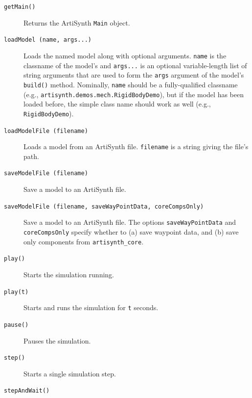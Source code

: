 \documentclass{article}
\begin{document}
\begin{description}

\item[{\tt getMain()}] \mbox{}

Returns the ArtiSynth {\tt Main} object.

\item[{\tt loadModel (name, args...)}] \mbox{}

Loads the named model along with optional arguments.  {\tt name} is
the classname of the model's
 and {\tt args...} is
an optional variable-length list of string arguments that are used to
form the {\tt args} argument of the model's {\tt build()} method.
Nominally, {\tt name} should be a fully-qualified classname (e.g.,
{\tt artisynth.demos.mech.RigidBodyDemo}), but if the model has been
loaded before, the simple class name should work as well (e.g., {\tt
RigidBodyDemo}).

\item[{\tt loadModelFile (filename)}] \mbox{}

Loads a model from an ArtiSynth file. {\tt filename} is a string
giving the file's path.

\item[{\tt saveModelFile (filename)}] \mbox{}

Save a model to an ArtiSynth file.

\item[{\tt saveModelFile (filename, saveWayPointData, coreCompsOnly)}] \mbox{}

Save a model to an ArtiSynth file. The options {\tt saveWayPointData}
and {\tt coreCompsOnly} specify whether to (a) save waypoint data, and
(b) save only components from {\tt artisynth\_core}.

\item[{\tt play()}] \mbox{}

Starts the simulation running.

\item[{\tt play(t)}] \mbox{}

Starts and runs the simulation for {\tt t} seconds.

\item[{\tt pause()}] \mbox{}

Pauses the simulation.

\item[{\tt step()}] \mbox{}

Starts a single simulation step.

\item[{\tt stepAndWait()}] \mbox{}


\end{description}
\end{document}
